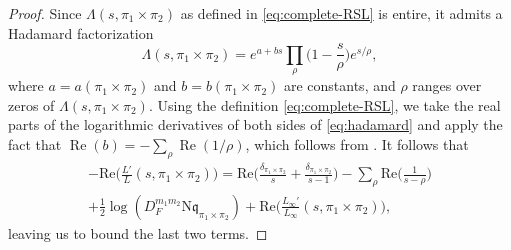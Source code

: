 \documentclass[12pt,reqno]{amsart}
\theoremstyle{remark}
\DeclareMathOperator{\Real}{Re}
\renewcommand{\Re}{\mathrm{Re}}
\newcommand{\N}{\mathrm{N}}
\newcommand{\kq}{\mathfrak{q}}
\numberwithin{equation}{section}
\begin{document}
    \begin{proof} Since $\Lambda(s, \pi_1 \times \pi_2)$ as defined in \eqref{eq:complete-RSL} is entire, it admits a Hadamard factorization
    \begin{equation}\label{eq:hadamard}
        \Lambda(s, \pi_1 \times \pi_2)= e^{a+bs} \prod_{\rho}\Big(1-\frac{s}{\rho}\Big)e^{s/\rho},
    \end{equation}
    where $a=a(\pi_1\times\pi_2)$ and $b = b(\pi_1\times \pi_2)$ are constants, and $\rho$ ranges over zeros of  $\Lambda(s, \pi_1 \times \pi_2)$.
    Using the definition \eqref{eq:complete-RSL}, we  take the real parts of the logarithmic derivatives of both sides of \eqref{eq:hadamard} and apply the fact that $\Real(b) = -\sum_{\rho}\Real(1/\rho)$, which follows from \cite[Theorem 5.7]{IK}. It follows that
        \begin{multline}\label{eq:hadamard-prod}
            -\Re\Big(\frac{L'}{L}(s, \pi_1 \times \pi_2)\Big) = \Re\Big(\frac{\delta_{\pi_1\times \pi_2}}{s} +\frac{\delta_{\pi_1\times \pi_2}}{s-1}\Big) - \sum_{\rho} \Re\Big(\frac{1}{s-\rho}\Big)\\
            + \frac{1}{2} \log(D_F^{m_1m_2}\N\kq_{\pi_1\times \pi_2}) + \Re\Big(\frac{L_{\infty}'}{L_{\infty}}(s, \pi_1 \times \pi_2)\Big),
        \end{multline}
        leaving us to bound the last two terms.
        

\end{proof}
\end{document}
